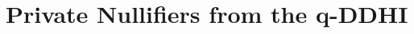 
































\clearpage
\section{Private Nullifiers from the q-DDHI}\label{sec:privacy-preserving-vrf}

